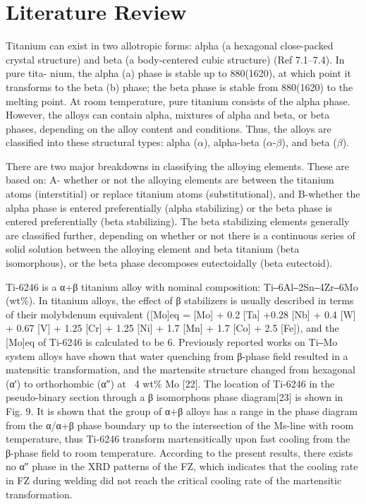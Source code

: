 \chapter{Literature Review}
Titanium can exist in two allotropic forms: alpha (a hexagonal close-packed crystal structure) and beta (a body-centered cubic structure) (Ref 7.1–7.4). In pure tita- nium, the alpha (a) phase is stable up to 880\degC (1620\degF), at which point it transforms to the beta (b) phase; the beta phase is stable from 880\degC (1620\degF) to the melting point. At room temperature, pure titanium consists of the alpha phase. However, the alloys can contain alpha, mixtures of alpha and beta, or beta phases, depending on the alloy content and conditions. Thus, the alloys are classified into these structural types: alpha ($\alpha$), alpha-beta ($\alpha$-$\beta$), and beta ($\beta$).

There are two major breakdowns in classifying the alloying elements. These are based on: A- whether or not the alloying elements are between the titanium atoms (interstitial) or replace titanium atoms (substitutional), and B-whether the alpha phase is entered preferentially (alpha stabilizing) or the beta phase is entered preferentially (beta stabilizing). The beta stabilizing elements generally are classified further, depending on whether or not there is a continuous series of solid solution between the alloying element and beta titanium (beta isomorphous), or the beta phase decomposes eutectoidally (beta eutectoid).


Ti-6246 is a α+β titanium alloy with nominal composition: Ti‒6Al‒2Sn‒4Zr‒6Mo (wt\%). In titanium alloys, the effect of β stabilizers is usually described in terms of their molybdenum equivalent ([Mo]eq = [Mo] + 0.2 [Ta] +0.28 [Nb] + 0.4 [W] + 0.67 [V] + 1.25 [Cr] + 1.25 [Ni] + 1.7 [Mn] + 1.7 [Co] + 2.5 [Fe]), and the [Mo]eq of Ti-6246 is calculated to be 6. Previously reported works on Ti‒Mo system alloys have shown that water quenching from β-phase field resulted in a matensitic transformation, and the martensite structure changed from hexagonal (α′) to orthorhombic (α″) at ~4 wt\% Mo [22]. The location of Ti-6246 in the pseudo-binary section through
a β isomorphous phase diagram[23] is shown in Fig. 9. It is shown that the group of α+β alloys has a
range in the phase diagram from the α/α+β phase boundary up to the intersection of the Ms-line
with room temperature, thus Ti-6246 transform martensitically upon fast cooling from the β-phase
field to room temperature. According to the present results, there exists no α″ phase in the XRD
patterns of the FZ, which indicates that the cooling rate in FZ during welding did not reach the
critical cooling rate of the martensitic transformation.

